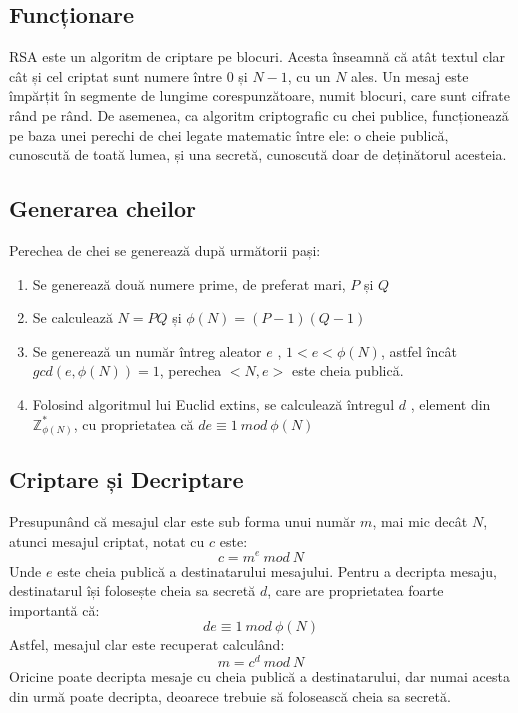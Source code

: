 \documentclass[12pt, oneside]{book}
\begin{document}
\subsection{Funcționare}
RSA este un algoritm de criptare pe blocuri. Acesta înseamnă că atât textul clar cât și cel criptat sunt numere între 0 și $N-1$, cu un $N$ ales. Un mesaj este împărțit în segmente de lungime corespunzătoare, numit blocuri, care sunt cifrate rând pe rând. De asemenea, ca algoritm criptografic cu chei publice, funcționează pe baza unei perechi de chei legate matematic între ele: o cheie publică, cunoscută de toată lumea, și una secretă, cunoscută doar de deținătorul acesteia.
\subsection{Generarea cheilor}
Perechea de chei se generează după următorii pași:
\begin{enumerate}
\item Se generează două numere prime, de preferat mari, $P$ și $Q$
\item Se calculează $N=PQ$ și $\phi(N)=(P-1)(Q-1)$
\item Se generează un număr întreg aleator $e$ , $1<e<\phi(N)$, astfel încât $gcd(e,\phi(N))=1$, perechea $<N,e>$ este cheia publică.
\item Folosind algoritmul lui Euclid extins, se calculează întregul $d$ , element din $\mathbb{Z}_{\phi(N)}^{*}$, cu proprietatea că $de \equiv 1 \ mod \ \phi(N)$
\end{enumerate}
\subsection{Criptare și Decriptare}
Presupunând că mesajul clar este sub forma unui număr $m$, mai mic decât $N$, atunci mesajul criptat, notat cu $c$ este:
$$c = m^e \ mod \ N$$
Unde $e$ este cheia publică a destinatarului mesajului. Pentru a decripta mesaju, destinatarul își folosește cheia sa secretă $d$, care are proprietatea foarte importantă că:
$$de \equiv 1 \ mod \ \phi(N)$$
Astfel, mesajul clar este recuperat calculând:
$$m = c^d \ mod \ N$$
Oricine poate decripta mesaje cu cheia publică a destinatarului, dar numai acesta din urmă poate decripta, deoarece trebuie să folosească cheia sa secretă.
\end{document}

